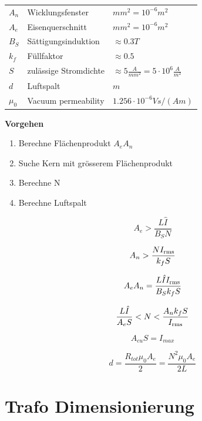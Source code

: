 \documentclass[10pt,landscape]{scrartcl}
\newcommand{\eqn}[3]
{
  \begin{minipage}[#1]{#2}
    \[ #3 \]
  \end{minipage}
}
\begin{document}
\begin{multicols}{2}
\begin{minipage}[h]{0.6\linewidth}
  \begin{tabular}{l l l |}
    $A_n$   & Wicklungsfenster      & $mm^2 = 10^{-6}m^2$ \\
    $A_e$   & Eisenquerschnitt      & $mm^2 = 10^{-6}m^2$ \\
    $B_S$   & Sättigungsinduktion   & $\approx 0.3T$ \\
    $k_f$   & Füllfaktor            & $\approx 0.5$ \\
    $S$     & zulässige Stromdichte & $\approx 5\frac{A}{mm^2}=5\cdot10^6\frac{A}{m^2}$ \\
    $d$     & Luftspalt             & $m$ \\
    $\mu_0$ & Vacuum permeability   & $1.256\cdot10^{-6}Vs/(Am)$
  \end{tabular}
\end{minipage}
\begin{minipage}[h]{0.3\linewidth}
\textbf{Vorgehen}
  \begin{enumerate}
    \item Berechne Flächenprodukt $A_e A_n$
    \item Suche Kern mit grösserem Flächenprodukt
    \item Berechne N
    \item Berechne Luftspalt
  \end{enumerate}
\end{minipage}


\eqn{h}{0.23\linewidth}{ A_e > \frac{L\hat{I}}{B_S N} }
\eqn{h}{0.23\linewidth}{ A_n > \frac{NI_{\textup{rms}}}{k_f S} }
\eqn{h}{0.23\linewidth}{ A_e A_n = \frac{L \hat{I} I_{\textup{rms}}}{B_S k_f S} }
\eqn{h}{0.23\linewidth}{ \frac{L \hat{I} }{A_e S} < N < \frac{A_n k_f S}{I_{\textup{rms}}} }

\eqn{h}{0.23\linewidth}{ A_{cu} S = I_{max} }
\eqn{h}{0.23\linewidth}{ d = \frac{R_{tot}\mu_0 A_e}{2} = \frac{N^2 \mu_0 A_e}{2L} }


\vfill\null
\columnbreak
\section{Trafo Dimensionierung}


\end{multicols}
\end{document}

